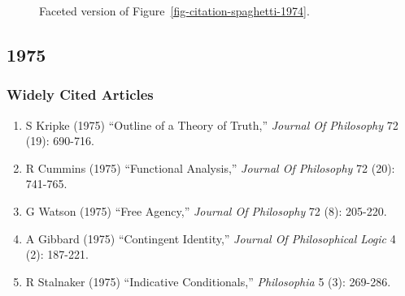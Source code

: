 \documentclass[
  10pt,
  letterpaper,
  DIV=11,
  numbers=noendperiod,
  twoside]{scrartcl}
\providecommand{\tightlist}{%
  \setlength{\itemsep}{0pt}\setlength{\parskip}{0pt}}\usepackage{longtable,booktabs,array}
\begin{document}
\begin{figure}


\caption{\label{fig-citation-facet-1974}Faceted version of
Figure~\ref{fig-citation-spaghetti-1974}.}

\end{figure}%

\newpage

\subsection{1975}\label{sec-s1975}

\subsubsection*{Widely Cited Articles}\label{widely-cited-articles-19}

\begin{enumerate}
\def\labelenumi{\arabic{enumi}.}
\tightlist
\item
  S Kripke (1975) ``Outline of a Theory of Truth,'' \emph{Journal Of
  Philosophy} 72 (19): 690-716.
\item
  R Cummins (1975) ``Functional Analysis,'' \emph{Journal Of Philosophy}
  72 (20): 741-765.
\item
  G Watson (1975) ``Free Agency,'' \emph{Journal Of Philosophy} 72 (8):
  205-220.
\item
  A Gibbard (1975) ``Contingent Identity,'' \emph{Journal Of
  Philosophical Logic} 4 (2): 187-221.
\item
  R Stalnaker (1975) ``Indicative Conditionals,'' \emph{Philosophia} 5
  (3): 269-286.
\end{enumerate}
\end{document}
